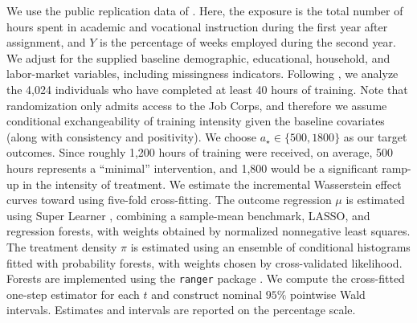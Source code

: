 \documentclass[11pt,twoside]{article}
\theoremstyle{definition}
\theoremstyle{remark}
\begin{document}
We use the public replication data of \citet{Colangelo02012026}. Here, the exposure is the total number of hours spent in academic and vocational instruction during the first year after assignment, and $Y$ is the percentage of weeks employed during the second year. We adjust for the supplied baseline demographic, educational, household, and labor-market variables, including missingness indicators. Following \citet{Colangelo02012026}, we analyze the 4{,}024 individuals who have completed at least 40 hours of training. Note that randomization only admits access to the Job Corps, and therefore we assume conditional exchangeability of training intensity given the baseline covariates (along with consistency and positivity). We choose $a_\star \in \{500,1800\}$ as our target outcomes. Since roughly 1{,}200 hours of training were received, on average, 500 hours represents a ``minimal'' intervention, and 1{,}800 would be a significant ramp-up in the intensity of treatment. We estimate the incremental Wasserstein effect curves toward using five-fold cross-fitting. The outcome regression $\mu$ is estimated using Super Learner \citep{vanderLaan2007SuperLearner, polley2019package}, combining a sample-mean benchmark, LASSO, and regression forests, with weights obtained by normalized nonnegative least squares. The treatment density $\pi$ is estimated using an ensemble of conditional histograms fitted with probability forests, with weights chosen by cross-validated likelihood. Forests are implemented using the \texttt{ranger} package \citep{wright2017}. We compute the cross-fitted one-step estimator for each $t$ and construct nominal $95\%$ pointwise Wald intervals. Estimates and intervals are reported on the percentage scale.
\end{document}
